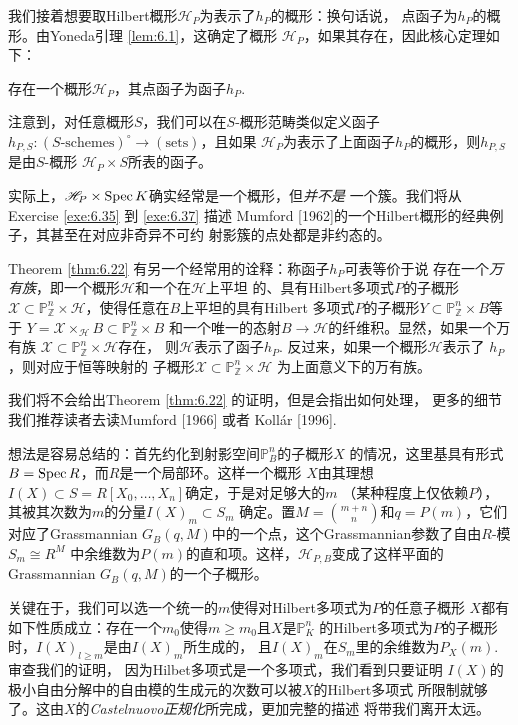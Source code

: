 我们接着想要取Hilbert概形$\mathscr H_P$为表示了$h_P$的概形：换句话说，
点函子为$h_P$的概形。由Yoneda引理 \eqref{lem:6.1}，这确定了概形
$\mathscr H_P$，如果其存在，因此核心定理如下：


\begin{thm}\label{thm:6.22}
存在一个概形$\mathscr H_P$，其点函子为函子$h_P$.
\end{thm}

注意到，对任意概形$S$，我们可以在$S$-概形范畴类似定义函子
$h_{P,S}:(\text{$S$-schemes})^\circ \to (\text{sets})$，且如果
$\mathscr H_P$为表示了上面函子$h_P$的概形，则$h_{P,S}$是由$S$-概形
$\mathscr H_P\times S$所表的函子。

实际上，$\mathscr H_P\times \operatorname{Spec} K$确实经常是一个概形，但\emph{并不是}
一个簇。我们将从 Exercise \ref{exe:6.35} 到 \ref{exe:6.37} 描述
Mumford [1962]的一个Hilbert概形的经典例子，其甚至在对应非奇异不可约
射影簇的点处都是非约态的。

Theorem \ref{thm:6.22} 有另一个经常用的诠释：称函子$h_P$可表等价于说
存在一个\emph{万有族}，即一个概形$\mathscr H$和一个在$\mathscr H$上平坦
的、具有Hilbert多项式$P$的子概形$\mathscr X\subset \mathbb 
P_{\mathbb Z}^n\times \mathscr H$，使得任意在$B$上平坦的具有Hilbert
多项式$P$的子概形$Y\subset \mathbb P_{\mathbb Z}^n\times B$等于
$Y=\mathscr X\times_{\mathscr H}B\subset \mathbb P_{\mathbb Z}^n\times B$
和一个唯一的态射$B\to \mathscr H$的纤维积。显然，如果一个万有族
$\mathscr X\subset \mathbb P_{\mathbb Z}^n\times \mathscr H$存在，
则$\mathscr H$表示了函子$h_P$. 反过来，如果一个概形$\mathscr H$表示了
$h_P$，则对应于恒等映射的
子概形$\mathscr X\subset \mathbb P_{\mathbb Z}^n \times \mathscr H$
为上面意义下的万有族。

我们将不会给出Theorem \ref{thm:6.22} 的证明，但是会指出如何处理，
更多的细节我们推荐读者去读Mumford [1966] 或者 Koll\'ar [1996].

想法是容易总结的：首先约化到射影空间$\mathbb P_B^n$的子概形$X$
的情况，这里基具有形式$B=\operatorname{Spec} R$，而$R$是一个局部环。这样一个概形
$X$由其理想$I(X)\subset S=R[X_0,\dots,X_n]$确定，于是对足够大的$m$
（某种程度上仅依赖$P$），其被其次数为$m$的分量$I(X)_m\subset S_m$
确定。置$M={{m+n}\choose n}$和$q=P(m)$，它们对应了Grassmannian
$G_B(q,M)$中的一个点，这个Grassmannian参数了自由$R$-模$S_m\cong R^M$
中余维数为$P(m)$的直和项。这样，$\mathscr H_{P,B}$变成了这样平面的
Grassmannian $G_B(q,M)$的一个子概形。

关键在于，我们可以选一个统一的$m$使得对Hilbert多项式为$P$的任意子概形
$X$都有如下性质成立：存在一个$m_0$使得$m\geq m_0$且$X$是$\mathbb P_K^n$
的Hilbert多项式为$P$的子概形时，$I(X)_{l\geq m}$是由$I(X)_m$所生成的，
且$I(X)_m$在$S_m$里的余维数为$P_X(m)$. 审查我们的证明，
因为Hilbet多项式是一个多项式，我们看到只要证明
$I(X)$的极小自由分解中的自由模的生成元的次数可以被$X$的Hilbert多项式
所限制就够了。这由$X$的\emph{Castelnuovo正规化}所完成，更加完整的描述
将带我们离开太远。

